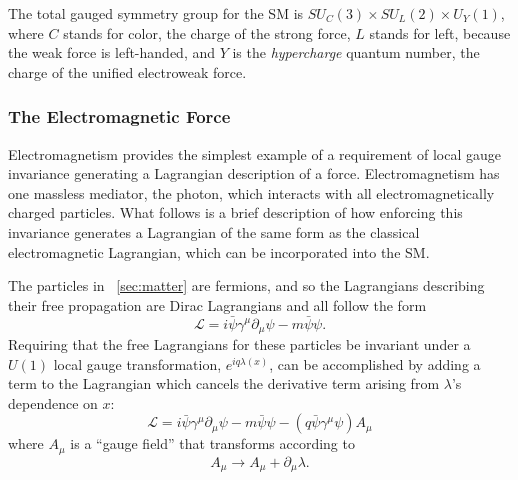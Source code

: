 The total gauged symmetry group for the \ac{SM} is $SU_C(3) \times SU_L(2) \times U_Y(1)$, where $C$ stands for color, the charge of the strong force, $L$ stands for left, because the weak force is left-handed, and $Y$ is the \textit{hypercharge} quantum number, the charge of the unified electroweak force. 



\subsubsection{The Electromagnetic Force}
\label{sec:em}

Electromagnetism provides the simplest example of a requirement of local gauge invariance generating a Lagrangian description of a force.
Electromagnetism has one massless mediator, the photon, which interacts with all electromagnetically charged particles. What follows is a brief description of how enforcing this invariance generates a Lagrangian of the same form as the classical electromagnetic Lagrangian, which can be incorporated into the \ac{SM}. 

The particles in ~\autoref{sec:matter} are fermions, and so the Lagrangians describing their free propagation are Dirac Lagrangians and all follow the form
%
\begin{equation}
\mathcal{L} = i\bar{\psi}\gamma^\mu \partial_\mu\psi - m \bar{\psi}\psi . 
\end{equation}
%
Requiring that the free Lagrangians for these particles be invariant under a $U(1)$ local gauge transformation, $e^{iq\lambda(x)}$, can be accomplished by adding a term to the Lagrangian which cancels the derivative term arising from $\lambda$'s dependence on $x$: 
%
\begin{equation}
\mathcal{L} = i\bar{\psi}\gamma^\mu \partial_\mu\psi - m \bar{\psi}\psi - (q\bar{\psi}\gamma^\mu\psi)A_\mu
\end{equation}
%
where $A_\mu$ is a ``gauge field'' that transforms according to 
%
\begin{equation}
A_\mu \rightarrow A_\mu + \partial_\mu \lambda . 
\end{equation}

